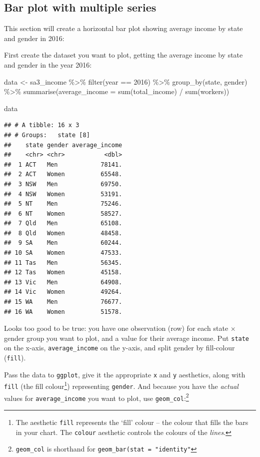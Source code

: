 \documentclass[
]{book}
\newenvironment{Shaded}{\begin{snugshade}}{\end{snugshade}}
\newcommand{\AttributeTok}[1]{\textcolor[rgb]{0.77,0.63,0.00}{#1}}
\newcommand{\DecValTok}[1]{\textcolor[rgb]{0.00,0.00,0.81}{#1}}
\newcommand{\FunctionTok}[1]{\textcolor[rgb]{0.00,0.00,0.00}{#1}}
\newcommand{\NormalTok}[1]{#1}
\newcommand{\OtherTok}[1]{\textcolor[rgb]{0.56,0.35,0.01}{#1}}
\newcommand{\SpecialCharTok}[1]{\textcolor[rgb]{0.00,0.00,0.00}{#1}}
\begin{document}
\hypertarget{bar-multi}{%
\subsection{Bar plot with multiple series}\label{bar-multi}}

This section will create a horizontal bar plot showing average income by state and gender in 2016:

First create the dataset you want to plot, getting the average income by state and gender in the year 2016:

\begin{Shaded}
\begin{Highlighting}[]
\NormalTok{data }\OtherTok{\textless{}{-}}\NormalTok{ sa3\_income }\SpecialCharTok{\%\textgreater{}\%} 
  \FunctionTok{filter}\NormalTok{(year }\SpecialCharTok{==} \DecValTok{2016}\NormalTok{) }\SpecialCharTok{\%\textgreater{}\%}   
  \FunctionTok{group\_by}\NormalTok{(state, gender) }\SpecialCharTok{\%\textgreater{}\%}   
  \FunctionTok{summarise}\NormalTok{(}\AttributeTok{average\_income =} \FunctionTok{sum}\NormalTok{(total\_income) }\SpecialCharTok{/} \FunctionTok{sum}\NormalTok{(workers))}

\NormalTok{data}
\end{Highlighting}
\end{Shaded}

\begin{verbatim}
## # A tibble: 16 x 3
## # Groups:   state [8]
##    state gender average_income
##    <chr> <chr>           <dbl>
##  1 ACT   Men            78141.
##  2 ACT   Women          65548.
##  3 NSW   Men            69750.
##  4 NSW   Women          53191.
##  5 NT    Men            75246.
##  6 NT    Women          58527.
##  7 Qld   Men            65108.
##  8 Qld   Women          48458.
##  9 SA    Men            60244.
## 10 SA    Women          47533.
## 11 Tas   Men            56345.
## 12 Tas   Women          45158.
## 13 Vic   Men            64908.
## 14 Vic   Women          49264.
## 15 WA    Men            76677.
## 16 WA    Women          51578.
\end{verbatim}

Looks too good to be true: you have one observation (row) for each state \(\times\) gender group you want to plot, and a value for their average income. Put \texttt{state} on the x-axis, \texttt{average\_income} on the y-axis, and split gender by fill-colour (\texttt{fill}).

Pass the data to \texttt{ggplot}, give it the appropriate \texttt{x} and \texttt{y} aesthetics, along with \texttt{fill} (the fill colour\footnote{The aesthetic \texttt{fill} represents the `fill' colour -- the colour that fills the bars in your chart. The \texttt{colour} aesthetic controls the colours of the \emph{lines}.}) representing \texttt{gender}. And because you have the \emph{actual} values for \texttt{average\_income} you want to plot, use \texttt{geom\_col}:\footnote{\texttt{geom\_col} is shorthand for \texttt{geom\_bar(stat\ =\ "identity"}}
\end{document}
